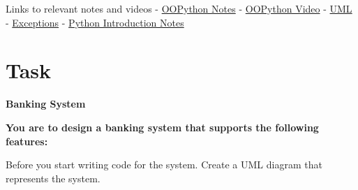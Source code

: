 Links to relevant notes and videos -
\href{https://hackmd.io/@RubAbella/BJQc35DNP}{OOPython Notes} -
\href{https://www.youtube.com/watch?v=Djjc2k1_6WE}{OOPython Video} -
\href{https://hackmd.io/@RubAbella/BJBHus-YS}{UML} -
\href{https://hackmd.io/@RubAbella/rk9RvE5Ew}{Exceptions} -
\href{https://hackmd.io/@RubAbella/Syz0e_k8B}{Python Introduction Notes}

\section{Task}\label{lab-exercise-7-designing-an-oop-system.md__task}

\textbf{Banking System}

\textbf{You are to design a banking system that supports the following
features:}

Before you start writing code for the system. Create a UML diagram that
represents the system.


